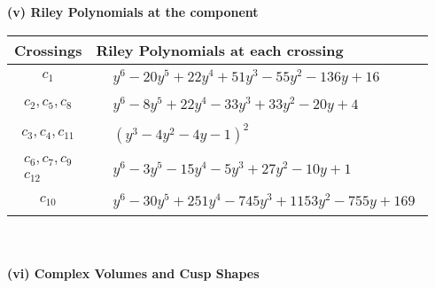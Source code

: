 \documentclass[1p]{elsarticle_modified}
\theoremstyle{definition}
\begin{document}
\newpage\renewcommand{\arraystretch}{1}
\flushleft \textbf{(v) Riley Polynomials at the component}\newline \\
\begin{tabular}{m{50pt}|m{274pt}}
Crossings & \hspace{64pt}Riley Polynomials at each crossing \\
\hline $$\begin{aligned}c_{1}\end{aligned}$$&$\begin{aligned}
&y^6-20 y^5+22 y^4+51 y^3-55 y^2-136 y+16
\end{aligned}$\\
\hline $$\begin{aligned}c_{2},c_{5},c_{8}\end{aligned}$$&$\begin{aligned}
&y^6-8 y^5+22 y^4-33 y^3+33 y^2-20 y+4
\end{aligned}$\\
\hline $$\begin{aligned}c_{3},c_{4},c_{11}\end{aligned}$$&$\begin{aligned}
&(y^3-4 y^2-4 y-1)^2
\end{aligned}$\\
\hline $$\begin{aligned}c_{6},c_{7},c_{9}\\c_{12}\end{aligned}$$&$\begin{aligned}
&y^6-3 y^5-15 y^4-5 y^3+27 y^2-10 y+1
\end{aligned}$\\
\hline $$\begin{aligned}c_{10}\end{aligned}$$&$\begin{aligned}
&y^6-30 y^5+251 y^4-745 y^3+1153 y^2-755 y+169
\end{aligned}$\\
\hline
\end{tabular}\\~\\
\newpage\flushleft \textbf{(vi) Complex Volumes and Cusp Shapes}
\end{document}
